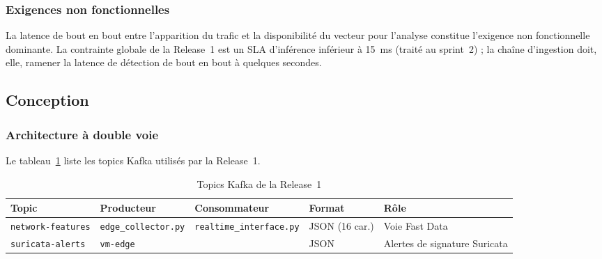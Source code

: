 \subsubsection{Exigences non fonctionnelles}

La latence de bout en bout entre l'apparition du trafic et la disponibilité du vecteur pour l'analyse constitue l'exigence non fonctionnelle dominante. La contrainte globale de la Release~1 est un SLA d'inférence inférieur à \SI{15}{\milli\second} (traité au sprint~2) ; la chaîne d'ingestion doit, elle, ramener la latence de détection de bout en bout à quelques secondes.

\subsection{Conception}

\subsubsection{Architecture à double voie}


Le tableau~\ref{tab:topics-r1} liste les topics Kafka utilisés par la Release~1.

\begin{table}[H]
\centering
\caption{Topics Kafka de la Release~1}
\label{tab:topics-r1}
\small
\begin{tabularx}{\textwidth}{@{}llll>{\raggedright\arraybackslash}X@{}}
\toprule
\textbf{Topic} & \textbf{Producteur} & \textbf{Consommateur} & \textbf{Format} & \textbf{Rôle} \\
\midrule
\texttt{network-features} & \texttt{edge\_collector.py} & \texttt{realtime\_interface.py} & JSON (16 car.) & Voie Fast Data \\
\texttt{suricata-alerts} & \texttt{vm-edge} & \A{consommateur} & JSON & Alertes de signature Suricata \\
\bottomrule
\end{tabularx}
\end{table}

